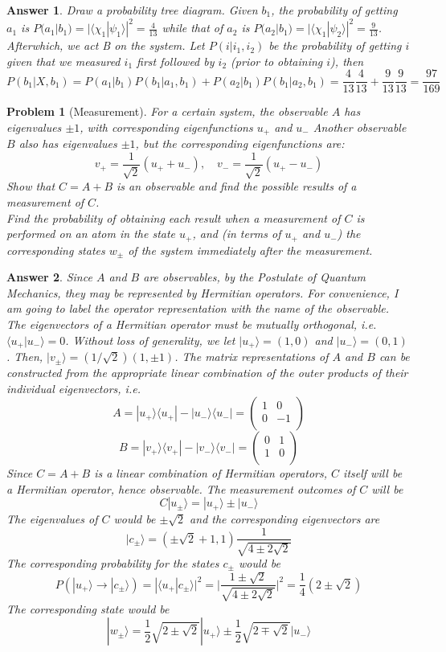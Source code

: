 \documentclass[a4paper]{article}
\newtheorem{ans}{Answer}[section]
\theoremstyle{new}
\newtheorem{qns}{Problem}[section]
\begin{document}
\begin{ans}
Draw a probability tree diagram. Given $b_1$, the probability of getting $a_1$ is $P(a_1|b_1)=|\langle\chi_1|\psi_1\rangle|^2=\frac{4}{13}$ while that of $a_2$ is $P(a_2|
b_1)=|\langle\chi_1|\psi_2\rangle|^2=\frac{9}{13}$. Afterwhich, we act B on the system. Let $P(i|i_1,i_2)$ be the probability of getting $i$ given that we measured $i_1$ first followed by $i_2$ (prior to obtaining $i$), then $$P(b_1|X,b_1)=P(a_1|b_1)P(b_1|a_1,b_1)+P(a_2|b_1)P(b_1|a_2,b_1)=\frac{4}{13}\frac{4}{13}+\frac{9}{13}\frac{9}{13}=\frac{97}{169}$$
\end{ans}
\begin{qns}[Measurement]
For a certain system, the observable $A$ has eigenvalues $\pm1$, with corresponding eigenfunctions $u_+$ and $u_-$ Another observable $B$ also has eigenvalues $\pm1$, but the corresponding eigenfunctions are:
$$v_+=\frac{1}{\sqrt{2}}(u_++u_-),\quad v_-=\frac{1}{\sqrt{2}}(u_+-u_-)$$
Show that $C = A + B$ is an observable and find the possible results of a measurement of $C$.\\[5pt]
Find the probability of obtaining each result when a measurement of $C$ is performed on an atom in the state $u_+$, and (in terms of $u_+$ and $u_-$) the corresponding states $w_\pm$ of the system immediately after the measurement.
\end{qns}
\begin{ans}
Since $A$ and $B$ are observables, by the Postulate of Quantum Mechanics, they may be represented by Hermitian operators. For convenience, I am going to label the operator representation with the name of the observable. The eigenvectors of a Hermitian operator must be mutually orthogonal, i.e. $\langle u_+|u_-\rangle=0$. Without loss of generality, we let $|u_+\rangle=(1,0)$ and $|u_-\rangle=(0,1)$. Then, $|v_\pm\rangle=(1/\sqrt{2})(1,\pm1)$. The matrix representations of $A$ and $B$ can be constructed from the appropriate linear combination of the outer products of their individual eigenvectors, i.e.
$$A=|u_+\rangle\langle u_+|-|u_-\rangle\langle u_-|=\begin{pmatrix}1&0\\0&-1\\\end{pmatrix}$$
$$B=|v_+\rangle\langle v_+|-|v_-\rangle\langle v_-|=\begin{pmatrix}0&1\\1&0\\\end{pmatrix}$$
Since $C=A+B$ is a linear combination of Hermitian operators, $C$ itself will be a Hermitian operator, hence observable. The measurement outcomes of $C$ will be
$$C|u_\pm\rangle=|u_+\rangle\pm|u_-\rangle$$
The eigenvalues of $C$ would be $\pm\sqrt{2}$ and the corresponding eigenvectors are $$|c_\pm\rangle=(\pm\sqrt{2}+1,1)\frac{1}{\sqrt{4\pm2\sqrt{2}}}$$
The corresponding probability for the states $c_\pm$ would be
$$P(|u_+\rangle\rightarrow|c_\pm\rangle)=|\langle u_+|c_\pm\rangle|^2=\bigg|\frac{1\pm\sqrt{2}}{\sqrt{4\pm2\sqrt{2}}}\bigg|^2=\frac{1}{4}(2\pm\sqrt{2})$$
The corresponding state would be 
$$|w_\pm\rangle=\frac{1}{2}\sqrt{2\pm\sqrt{2}}|u_+\rangle\pm\frac{1}{2}\sqrt{2\mp\sqrt{2}}|u_-\rangle$$
\end{ans}
\end{document}
